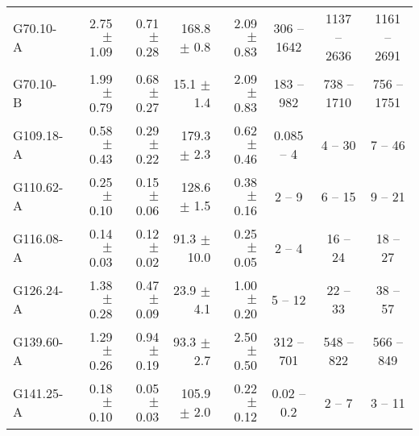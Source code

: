 \documentclass[printer]{aa}
\begin{document}
\begin{table*}[t]
\begin{tabular}{l r r r r c c c}
G70.10-A & 2.75 $\pm$ 1.09 & 0.71 $\pm$ 0.28 & 168.8 $\pm$   0.8 & 2.09 $\pm$ 0.83 &  306 -- 1642 & 1137 -- 2636 & 1161 -- 2691 \\
G70.10-B & 1.99 $\pm$ 0.79 & 0.68 $\pm$ 0.27 &  15.1 $\pm$   1.4 & 2.09 $\pm$ 0.83 &  183 --  982 &  738 -- 1710 &  756 -- 1751 \\
G109.18-A & 0.58 $\pm$ 0.43 & 0.29 $\pm$ 0.22 & 179.3 $\pm$   2.3 & 0.62 $\pm$ 0.46 &    0.085 --    4 &    4 --   30 &    7 --   46 \\
G110.62-A & 0.25 $\pm$ 0.10 & 0.15 $\pm$ 0.06 & 128.6 $\pm$   1.5 & 0.38 $\pm$ 0.16 &    2 --    9 &    6 --   15 &    9 --   21 \\
G116.08-A & 0.14 $\pm$ 0.03 & 0.12 $\pm$ 0.02 &  91.3 $\pm$  10.0 & 0.25 $\pm$ 0.05 &    2 --    4 &   16 --   24 &   18 --   27 \\
G126.24-A & 1.38 $\pm$ 0.28 & 0.47 $\pm$ 0.09 &  23.9 $\pm$   4.1 & 1.00 $\pm$ 0.20 &    5 --   12 &   22 --   33 &   38 --   57 \\
G139.60-A & 1.29 $\pm$ 0.26 & 0.94 $\pm$ 0.19 &  93.3 $\pm$   2.7 & 2.50 $\pm$ 0.50 &  312 --  701 &  548 --  822 &  566 --  849 \\
G141.25-A & 0.18 $\pm$ 0.10 & 0.05 $\pm$ 0.03 & 105.9 $\pm$   2.0 & 0.22 $\pm$ 0.12 &    0.02 --    0.2 &    2 --    7 &    3 --   11 \\

\end{tabular}
\end{table*}
\end{document}
